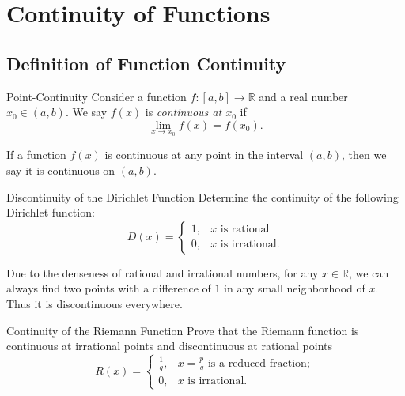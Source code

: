 \section{Continuity of Functions}

\subsection{Definition of Function Continuity}

\begin{definition}{Point-Continuity}{}
  Consider a function $f: [a, b] \rightarrow \mathbb{R}$
  and a real number $x_0 \in (a, b)$.
  We say $f(x)$ is \emph{continuous at $x_0$} if
  \begin{equation}
    \lim \limits _{x \rightarrow x_0} f(x) = f(x_0).
  \end{equation}
\end{definition}

\begin{note}
  If a function $f(x)$ is continuous at any point in the interval $(a, b)$,
  then we say it is continuous on $(a, b)$.
\end{note}

\begin{example}{Discontinuity of the Dirichlet Function}{}
  Determine the continuity of the following Dirichlet function:
  \begin{equation}
    D(x) =
    \begin{cases}
      1, & x \text{ is rational}\\
      0, & x \text{ is irrational}.
    \end{cases}
  \end{equation}
\end{example}

\begin{solution}
  Due to the denseness of rational and irrational numbers,
  for any $x \in \mathbb{R}$,
  we can always find two points with a difference of $1$ in any small neighborhood of
  $x$.
  Thus it is discontinuous everywhere.
\end{solution}

\begin{example}{Continuity of the Riemann Function}{}
  Prove that the Riemann function is continuous at irrational points
  and discontinuous at rational points
  \begin{equation}
    R(x) =
    \begin{cases}
      \frac{1}{q}, & x = \frac{p}{q} \text{ is a reduced fraction};\\
      0, & x \text{ is irrational}.
    \end{cases}
  \end{equation}
\end{example}

